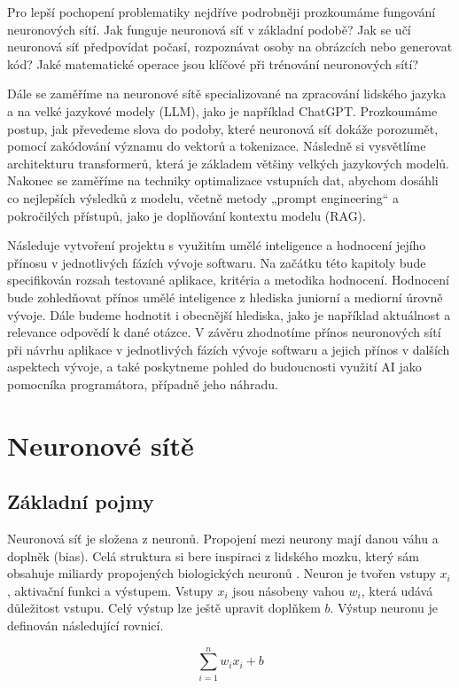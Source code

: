 \documentclass[FM,DP]{tulthesis}
\begin{document}
		Pro lepší pochopení problematiky nejdříve podrobněji prozkoumáme fungování neuronových sítí. Jak funguje neuronová síť v základní podobě? Jak se učí neuronová síť předpovídat počasí, rozpoznávat osoby na obrázcích nebo generovat kód? Jaké matematické operace jsou klíčové při trénování neuronových sítí?
		
		Dále se zaměříme na neuronové sítě specializované na zpracování lidského jazyka a na velké jazykové modely (LLM), jako je například ChatGPT. Prozkoumáme postup, jak převedeme slova do podoby, které neuronová síť dokáže porozumět, pomocí zakódování významu do vektorů a tokenizace. Následně si vysvětlíme architekturu transformerů, která je základem většiny velkých jazykových modelů. Nakonec se zaměříme na techniky optimalizace vstupních dat, abychom dosáhli co nejlepších výsledků z modelu, včetně metody „prompt engineering“ a pokročilých přístupů, jako je doplňování kontextu modelu (RAG).
		
		Následuje vytvoření projektu s využitím umělé inteligence a hodnocení jejího přínosu v jednotlivých fázích vývoje softwaru. Na začátku této kapitoly bude specifikován rozsah testované aplikace, kritéria a metodika hodnocení. Hodnocení bude zohledňovat přínos umělé inteligence z hlediska juniorní a mediorní úrovně vývoje. Dále budeme hodnotit i obecnější hlediska, jako je například aktuálnost a relevance odpovědí k dané otázce. V závěru zhodnotíme přínos neuronových sítí při návrhu aplikace v jednotlivých fázích vývoje softwaru a jejich přínos v dalších aspektech vývoje, a také poskytneme pohled do budoucnosti využití AI jako pomocníka programátora, případně jeho náhradu.
		
		\chapter{Neuronové sítě} \label{nns}
		\section{Základní pojmy}
		Neuronová síť je složena z neuronů. Propojení mezi neurony mají danou váhu a doplněk (bias). Celá struktura si bere inspiraci z lidského mozku, který sám obsahuje miliardy propojených biologických neuronů \cite{general}. Neuron je tvořen vstupy $x_i$, aktivační funkci a výstupem. Vstupy $x_i$ jsou násobeny vahou $w_i$, která udává důležitost vstupu. Celý výstup lze ještě upravit doplňkem $b$. Výstup neuronu je definován následující rovnicí.

		\begin{equation}
			\sum_{i=1}^{n} w_i x_i + b
		\end{equation}
		
\end{document}
